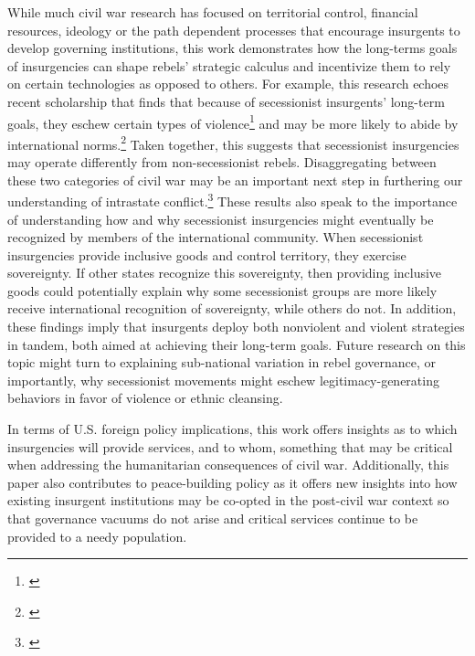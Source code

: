 \documentclass[12pt, letterpaper]{article}
\begin{document}
While much civil war research has focused on territorial control, financial resources, ideology or the path dependent processes that encourage insurgents to develop governing institutions, this work demonstrates how the long-terms goals of insurgencies can shape rebels' strategic calculus and incentivize them to rely on certain technologies as opposed to others. For example, this research echoes recent scholarship that finds that because of secessionist insurgents' long-term goals, they eschew certain types of violence\footnote{\citealt{fazal2013secessionism}} and may be more likely to abide by international norms.\footnote{\citealt{lasley2014secession}} Taken together, this suggests that secessionist insurgencies may operate differently from non-secessionist rebels. Disaggregating between these two categories of civil war may be an important next step in furthering our understanding of intrastate conflict.\footnote{\citealt{lacina2015periphery}} These results also speak to the importance of understanding how and why secessionist insurgencies might eventually be recognized by members of the international community. When secessionist insurgencies provide inclusive goods and control territory, they exercise sovereignty. If other states recognize this sovereignty, then providing inclusive goods could potentially explain why some secessionist groups are more likely receive international recognition of sovereignty, while others do not. In addition, these findings imply that insurgents deploy both nonviolent and violent strategies in tandem, both aimed at achieving their long-term goals. Future research on this topic might turn to explaining sub-national variation in rebel governance, or importantly, why secessionist movements might eschew legitimacy-generating behaviors in favor of violence or ethnic cleansing. 


In terms of U.S. foreign policy implications, this work offers insights as to which insurgencies will provide services, and to whom, something that may be critical when addressing the humanitarian consequences of civil war. Additionally, this paper also contributes to peace-building policy as it offers new insights into how existing insurgent institutions may be co-opted in the post-civil war context so that governance vacuums do not arise and critical services continue to be provided to a needy population.
\end{document}
